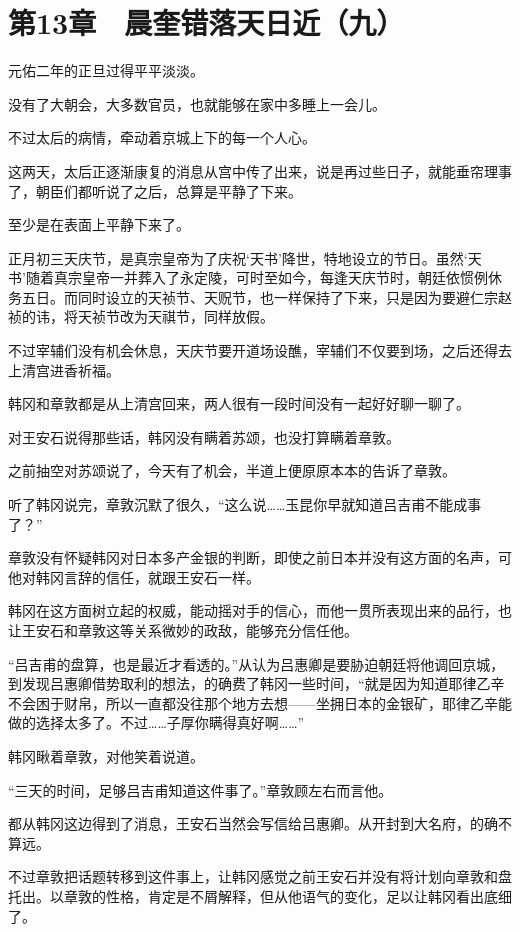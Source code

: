 \section{第13章　晨奎错落天日近（九）}

元佑二年的正旦过得平平淡淡。

没有了大朝会，大多数官员，也就能够在家中多睡上一会儿。

不过太后的病情，牵动着京城上下的每一个人心。

这两天，太后正逐渐康复的消息从宫中传了出来，说是再过些日子，就能垂帘理事了，朝臣们都听说了之后，总算是平静了下来。

至少是在表面上平静下来了。

正月初三天庆节，是真宗皇帝为了庆祝‘天书’降世，特地设立的节日。虽然‘天书’随着真宗皇帝一并葬入了永定陵，可时至如今，每逢天庆节时，朝廷依惯例休务五日。而同时设立的天祯节、天贶节，也一样保持了下来，只是因为要避仁宗赵祯的讳，将天祯节改为天祺节，同样放假。

不过宰辅们没有机会休息，天庆节要开道场设醮，宰辅们不仅要到场，之后还得去上清宫进香祈福。

韩冈和章敦都是从上清宫回来，两人很有一段时间没有一起好好聊一聊了。

对王安石说得那些话，韩冈没有瞒着苏颂，也没打算瞒着章敦。

之前抽空对苏颂说了，今天有了机会，半道上便原原本本的告诉了章敦。

听了韩冈说完，章敦沉默了很久，“这么说……玉昆你早就知道吕吉甫不能成事了？”

章敦没有怀疑韩冈对日本多产金银的判断，即使之前日本并没有这方面的名声，可他对韩冈言辞的信任，就跟王安石一样。

韩冈在这方面树立起的权威，能动摇对手的信心，而他一贯所表现出来的品行，也让王安石和章敦这等关系微妙的政敌，能够充分信任他。

“吕吉甫的盘算，也是最近才看透的。”从认为吕惠卿是要胁迫朝廷将他调回京城，到发现吕惠卿借势取利的想法，的确费了韩冈一些时间，“就是因为知道耶律乙辛不会困于财帛，所以一直都没往那个地方去想——坐拥日本的金银矿，耶律乙辛能做的选择太多了。不过……子厚你瞒得真好啊……”

韩冈瞅着章敦，对他笑着说道。

“三天的时间，足够吕吉甫知道这件事了。”章敦顾左右而言他。

都从韩冈这边得到了消息，王安石当然会写信给吕惠卿。从开封到大名府，的确不算远。

不过章敦把话题转移到这件事上，让韩冈感觉之前王安石并没有将计划向章敦和盘托出。以章敦的性格，肯定是不屑解释，但从他语气的变化，足以让韩冈看出底细了。

